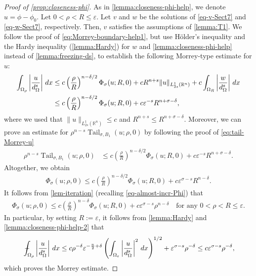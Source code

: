 \documentclass[11pt,reqno]{amsart}
\theoremstyle{plain}
\theoremstyle{definition}
\numberwithin{equation}{section}
\newcommand{\R}{\mathbb{R}}
\newcommand{\eps}{\varepsilon}
\newcommand{\1}{\mathbbm{1}}
\DeclareMathOperator{\tail}{Tail}
\renewcommand{\d}{\textnormal{\,d}}
\newcommand{\average}{{\mathchoice {\kern1ex\vcenter{\hrule height.4pt
width 6pt depth0pt} \kern-9.7pt} {\kern1ex\vcenter{\hrule
height.4pt width 4.3pt depth0pt} \kern-7pt} {} {} }}
\newcommand{\dashint}{\average\int}
\begin{document}
\begin{proof}[Proof of \autoref{prop:closeness-phi}]
As in \autoref{lemma:closeness-phi-help}, we denote $u = \phi - \phi_0$. Let $0 < \rho < R \le \varepsilon$. Let $v$ and $w$ be the solutions of \eqref{eq-v-Sect7} and \eqref{eq-w-Sect7}, respectively. Then, $v$ satisfies the assumptions of \autoref{lemma:T1}. We follow the proof of \eqref{eq:Morrey-boundary-help1}, but use H\"older's inequality and the Hardy inequality (\autoref{lemma:Hardy}) for $w$ and \autoref{lemma:closeness-phi-help} instead of \autoref{lemma:freezing-ds}, to establish the following Morrey-type estimate for $u$:
\begin{align*}
    \int_{\Omega_{\rho}} \left| \frac{u}{d_{\Omega}^s} \right| \d x
    &\le c \left( \frac{\rho}{R} \right)^{n-\delta/2} \Phi_{\sigma}(u; R,0) + cR^{n+s} \|u\|_{L^1_{2s}(\R^n)} + c\int_{\Omega_R} \left| \frac{w}{d_{\Omega}^s} \right| \d x \\
    &\le c \left( \frac{\rho}{R} \right)^{n-\delta/2} \Phi_{\sigma}(u; R,0) + c\eps^{-s} R^{n + \sigma - \delta},
\end{align*}
where we used that $\|u\|_{L^1_{2s}(\R^n)} \leq c$ and $R^{n+s} \leq R^{n+\sigma-\delta}$. Moreover, we can prove an estimate for $\rho^{n-s} \tail_{\sigma,B_1}(u;\rho,0)$ by following the proof of \eqref{eq:tail-Morrey-u}
\begin{align*}
    \rho^{n-s} \tail_{\sigma,B_1}(u;\rho,0) &\le c \left( \frac{\rho}{R} \right)^{n-\delta/2}  \Phi_{\sigma}(u; R, 0) + c \eps^{-s} R^{n + \sigma - \delta}.
    \end{align*}
Altogether, we obtain
\begin{align*}
    \Phi_{\sigma}(u; \rho,0) \le c \left( \frac{\rho}{R} \right)^{n-\delta/2} \Phi_{\sigma}(u; R, 0) + c \varepsilon^{\sigma-s} R^{n - \delta}.
\end{align*}
It follows from \autoref{lem-iteration} (recalling \eqref{eq-almost-incr-Phi}) that
\begin{align}\label{eq-Hopf-Morrey}
    \Phi_{\sigma}(u; \rho, 0) \le c \left( \frac{\rho}{R} \right)^{n-\delta} \Phi_{\sigma}(u; R, 0) + c \eps^{ \sigma-s} \rho^{n - \delta} \quad\text{for any }0<\rho<R\leq \varepsilon.
\end{align}
In particular, by setting $R := \eps$, it follows from \autoref{lemma:Hardy} and \autoref{lemma:closeness-phi-help-2} that
\begin{align}
\label{eq:Hopf-Morrey}
   \dashint_{\Omega_{\rho}} \left| \frac{u}{d_{\Omega}^s} \right| \d x \leq c\rho^{-\delta} \varepsilon^{-\frac{n}{2}+\delta} \left( \int_{\Omega_\varepsilon} \left| \frac{u}{d_\Omega^s} \right|^2 \d x \right)^{1/2} + \varepsilon^{\sigma-s}\rho^{-\delta} \le c \eps^{\sigma-s}\rho^{-\delta},
\end{align}
which proves the Morrey estimate. 



\end{proof}
\end{document}
